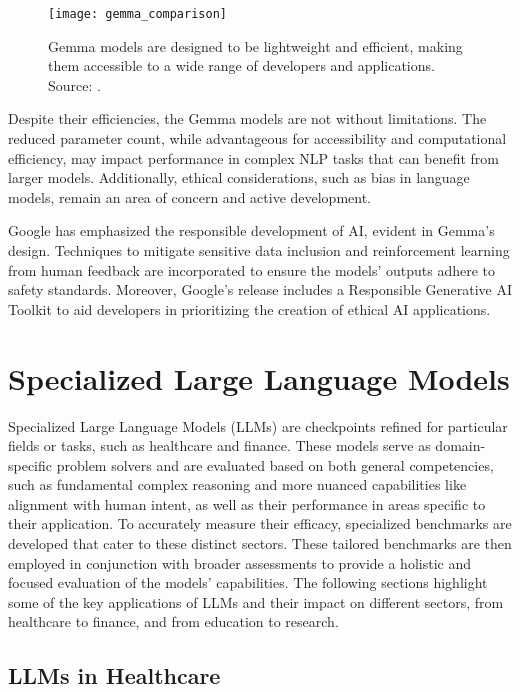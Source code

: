 \begin{figure}[ht!]
    \centering
    \texttt{[image: gemma\_comparison]}
    \caption{Gemma models are designed to be lightweight and efficient, making them accessible to a wide range of developers and applications. Source: \protect\cite{gemma_google_ai}.}
    \label{fig:gemma-comparison}
\end{figure}

Despite their efficiencies, the Gemma models are not without limitations.
The reduced parameter count, while advantageous for accessibility and computational efficiency, may impact performance in complex NLP tasks that can benefit from larger models.
Additionally, ethical considerations, such as bias in language models, remain an area of concern and active development.

Google has emphasized the responsible development of AI, evident in Gemma's design.
Techniques to mitigate sensitive data inclusion and reinforcement learning from human feedback are incorporated to ensure the models' outputs adhere to safety standards.
Moreover, Google's release includes a Responsible Generative AI Toolkit to aid developers in prioritizing the creation of ethical AI applications.


\section{Specialized Large Language Models}
\label{sec:applications-of-large-language-models}

Specialized Large Language Models (LLMs) are checkpoints refined for particular fields or tasks, such as healthcare and finance.
These models serve as domain-specific problem solvers and are evaluated based on both general competencies, such as fundamental complex reasoning and more nuanced capabilities like alignment with human intent, as well as their performance in areas specific to their application.
To accurately measure their efficacy, specialized benchmarks are developed that cater to these distinct sectors.
These tailored benchmarks are then employed in conjunction with broader assessments to provide a holistic and focused evaluation of the models' capabilities.
The following sections highlight some of the key applications of LLMs and their impact on different sectors, from healthcare to finance, and from education to research.

\subsection{LLMs in Healthcare}
\label{subsec:llms-in-healthcare}

